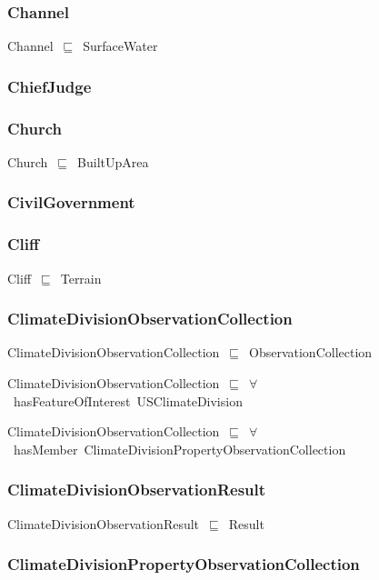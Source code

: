 \documentclass{article}
\begin{document}
\subsubsection*{Channel}

Channel~\ensuremath{\sqsubseteq}~SurfaceWater~

\subsubsection*{ChiefJudge}

\subsubsection*{Church}

Church~\ensuremath{\sqsubseteq}~BuiltUpArea~

\subsubsection*{CivilGovernment}

\subsubsection*{Cliff}

Cliff~\ensuremath{\sqsubseteq}~Terrain~

\subsubsection*{ClimateDivisionObservationCollection}

ClimateDivisionObservationCollection~\ensuremath{\sqsubseteq}~ObservationCollection~

ClimateDivisionObservationCollection~\ensuremath{\sqsubseteq}~\ensuremath{\forall}~hasFeatureOfInterest~USClimateDivision~

ClimateDivisionObservationCollection~\ensuremath{\sqsubseteq}~\ensuremath{\forall}~hasMember~ClimateDivisionPropertyObservationCollection~

\subsubsection*{ClimateDivisionObservationResult}

ClimateDivisionObservationResult~\ensuremath{\sqsubseteq}~Result~

\subsubsection*{ClimateDivisionPropertyObservationCollection}
\end{document}
